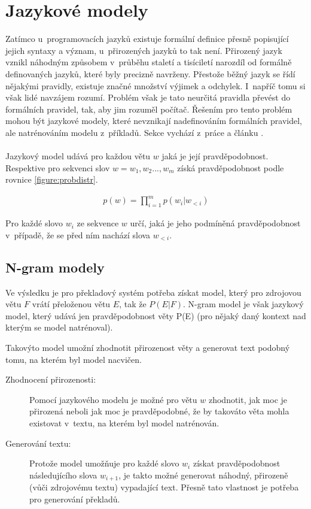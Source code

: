 \section{Jazykové modely}\label{section:langmodel}
Zatímco u~programovacích jazyků existuje formální definice přesně popisující jejich syntaxy a význam, u~přirozených jazyků to tak není. Přirozený jazyk vznikl náhodným způsobem v~průběhu staletí a tisíciletí narozdíl od formálně definovaných jazyků, které byly precizně navrženy. Přestože běžný jazyk se řídí nějakými pravidly, existuje značné množství výjimek a odchylek. I~napříč tomu si však lidé navzájem rozumí. Problém však je tato neurčitá pravidla převést do formálních pravidel, tak, aby jim rozuměl počítač. Řešením pro tento problém mohou být jazykové modely, které nevznikají nadefinováním formálních pravidel, ale natrénováním modelu z~příkladů. Sekce vychází z~práce \cite{nmtThesis} a článku \cite{nmtTutorial}.
\\\\
Jazykový model udává pro každou větu $w$ jaká je její pravděpodobnost. Respektive pro sekvenci slov $w = w_1, w_2..., w_m$ získá pravděpodobnost podle rovnice \ref{figure:probdistr}.

\begin{align}\label{figure:probdistr}
  p(w) = \prod_{i=1}^{m} p(w_i|w_{<i})
\end{align}

Pro každé slovo $w_i$ ze sekvence $w$ určí, jaká je jeho podmíněná pravděpodobnost v~případě, že se před ním nachází slova $w_{<i}$.

\subsection{N-gram modely}\label{subsection:ngram}
Ve výsledku je pro překladový systém potřeba získat model, který pro zdrojovou větu $F$ vrátí přeloženou větu $E$, tak že $P(E|F)$. N-gram model je však jazykový model, který udává jen pravděpodobnost věty P(E) (pro nějaký daný kontext nad kterým se model natrénoval).

Takovýto model umožní zhodnotit přirozenost věty a generovat text podobný tomu, na kterém byl model nacvičen.

\begin{description}
  \item[Zhodnocení přirozenosti:] Pomocí jazykového modelu je možné pro větu $w$ zhodnotit, jak moc je přirozená neboli jak moc je pravděpodobné, že by takováto věta mohla existovat v~textu, na kterém byl model natrénován.
  \item[Generování textu:] Protože model umožňuje pro každé slovo $w_i$ získat pravděpodobnost následujícího slova $w_{i+1}$, je takto možné generovat náhodný, přirozeně (vůči zdrojovému textu) vypadající text. Přesně tato vlastnost je potřeba pro generování překladů.
\end{description}

